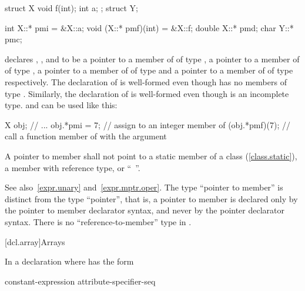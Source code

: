 \pnum
\begin{example}%

\begin{codeblock}
struct X {
  void f(int);
  int a;
};
struct Y;

int X::* pmi = &X::a;
void (X::* pmf)(int) = &X::f;
double X::* pmd;
char Y::* pmc;
\end{codeblock}

declares
,
,
and
to be a pointer to a member of
of type
,
a pointer to a member of
of type
,
a pointer to a member of
of type
and a pointer to a member of
of type
respectively.
The declaration of
is well-formed even though
has no members of type
.
Similarly, the declaration of
is well-formed even though
is an incomplete type.
and
can be used like this:
\begin{codeblock}
X obj;
// ...
obj.*pmi = 7;       // assign  to an integer member of 
(obj.*pmf)(7);      // call a function member of  with the argument 
\end{codeblock}
\end{example}

\pnum
A pointer to member shall not point to a static member
of a class (\ref{class.static}),
a member with reference type,
or
``\cv{}~''.

\begin{note}
See also~\ref{expr.unary} and~\ref{expr.mptr.oper}.
The type ``pointer to member'' is distinct from the type ``pointer'',
that is, a pointer to member is declared only by the pointer to member
declarator syntax, and never by the pointer declarator syntax.
There is no ``reference-to-member'' type in \Cpp.
\end{note}

[dcl.array]{Arrays}%

\pnum
In a declaration
where
has the form

\begin{ncsimplebnf}
\terminal{D1 [} constant-expression\opt{} \terminal{]} attribute-specifier-seq\opt
\end{ncsimplebnf}

